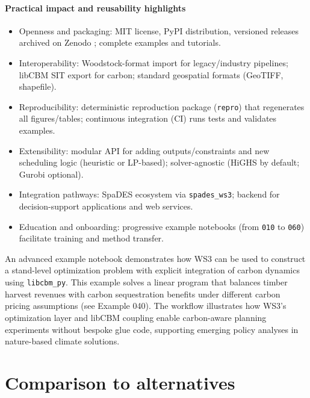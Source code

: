 \documentclass[review]{elsarticle}
\begin{document}
\paragraph{Practical impact and reusability highlights}
\begin{itemize}
  \item Openness and packaging: MIT license, PyPI distribution, versioned releases archived on Zenodo \citep{ws3_zenodo2025}; complete examples and tutorials.
  \item Interoperability: Woodstock-format import for legacy/industry pipelines; libCBM SIT export for carbon; standard geospatial formats (GeoTIFF, shapefile).
  \item Reproducibility: deterministic reproduction package (\texttt{repro}) that regenerates all figures/tables; continuous integration (CI) runs tests and validates examples.
  \item Extensibility: modular API for adding outputs/constraints and new scheduling logic (heuristic or LP-based); solver-agnostic (HiGHS by default; Gurobi optional).
  \item Integration pathways: SpaDES ecosystem via \texttt{spades\_ws3}; backend for decision-support applications and web services.
  \item Education and onboarding: progressive example notebooks (from \texttt{010} to \texttt{060}) facilitate training and method transfer.
\end{itemize}

An advanced example notebook demonstrates how WS3 can be used to construct a stand-level optimization problem with explicit integration of carbon dynamics using \texttt{libcbm\_py}. This example solves a linear program that balances timber harvest revenues with carbon sequestration benefits under different carbon pricing assumptions (see Example 040). The workflow illustrates how WS3’s optimization layer and libCBM coupling enable carbon-aware planning experiments without bespoke glue code, supporting emerging policy analyses in nature-based climate solutions.

\section{Comparison to alternatives}
\end{document}
